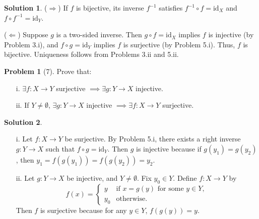 \documentclass{article}
\theoremstyle{definition}
\newtheorem{problem}{Problem}
\newtheorem{solution}{Solution}
\begin{document}
\begin{solution}
($\Rightarrow$) If $f$ is bijective, its inverse $f^{-1}$ satisfies $f^{-1} \circ f = \text{id}_X$ and $f \circ f^{-1} = \text{id}_Y$.

($\Leftarrow$) Suppose $g$ is a two-sided inverse. Then $g \circ f = \text{id}_X$ implies $f$ is injective (by Problem 3.i), and $f \circ g = \text{id}_Y$ implies $f$ is surjective (by Problem 5.i). Thus, $f$ is bijective. Uniqueness follows from Problems 3.ii and 5.ii.
\end{solution}

\begin{problem}[7]
Prove that:
\begin{enumerate}
    \item[i.] $\exists f : X \longrightarrow Y$ surjective $\implies \exists g : Y \longrightarrow X$ injective.
    \item[ii.] If $Y \neq \emptyset$, $\exists g : Y \longrightarrow X$ injective $\implies \exists f : X \longrightarrow Y$ surjective.
\end{enumerate}
\end{problem}

\begin{solution}
\begin{enumerate}
    \item[i.] Let $f : X \longrightarrow Y$ be surjective. By Problem 5.i, there exists a right inverse $g : Y \longrightarrow X$ such that $f \circ g = \text{id}_Y$. Then $g$ is injective because if $g(y_1) = g(y_2)$, then $y_1 = f(g(y_1)) = f(g(y_2)) = y_2$.

    \item[ii.] Let $g : Y \longrightarrow X$ be injective, and $Y \neq \emptyset$. Fix $y_0 \in Y$. Define $f : X \longrightarrow Y$ by
    \[
    f(x) = 
    \begin{cases}
    y & \text{if } x = g(y) \text{ for some } y \in Y, \\
    y_0 & \text{otherwise}.
    \end{cases}
    \]
    Then $f$ is surjective because for any $y \in Y$, $f(g(y)) = y$.
\end{enumerate}
\end{solution}
\end{document}
